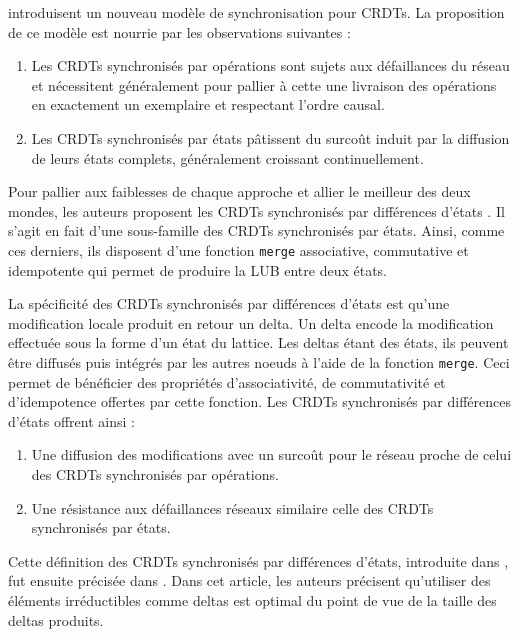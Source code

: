\textcite{almeida2015delta} introduisent un nouveau modèle de synchronisation pour \acp{CRDT}.
La proposition de ce modèle est nourrie par les observations suivantes :
\begin{enumerate}
  \item Les \acp{CRDT} synchronisés par opérations sont sujets aux défaillances du réseau et nécessitent généralement pour pallier à cette  une livraison des opérations en exactement un exemplaire et respectant l'ordre causal.
  \item Les \acp{CRDT} synchronisés par états pâtissent du surcoût induit par la diffusion de leurs états complets, généralement croissant continuellement.
\end{enumerate}

Pour pallier aux faiblesses de chaque approche et allier le meilleur des deux mondes, les auteurs proposent les \acp{CRDT} synchronisés par différences d'états \cite{almeida2015delta,Almeida_2018, enes2019}.
Il s'agit en fait d'une sous-famille des \acp{CRDT} synchronisés par états.
Ainsi, comme ces derniers, ils disposent d'une fonction \texttt{merge} associative, commutative et idempotente qui permet de produire la LUB entre deux états.

La spécificité des \acp{CRDT} synchronisés par différences d'états est qu'une modification locale produit en retour un delta.
Un delta encode la modification effectuée sous la forme d'un état du lattice.
Les deltas étant des états, ils peuvent être diffusés puis intégrés par les autres noeuds à l'aide de la fonction \texttt{merge}.
Ceci permet de bénéficier des propriétés d'associativité, de commutativité et d'idempotence offertes par cette fonction.
Les \acp{CRDT} synchronisés par différences d'états offrent ainsi :
\begin{enumerate}
  \item Une diffusion des modifications avec un surcoût pour le réseau proche de celui des \acp{CRDT} synchronisés par opérations.
  \item Une résistance aux défaillances réseaux similaire celle des \acp{CRDT} synchronisés par états.
\end{enumerate}

Cette définition des \acp{CRDT} synchronisés par différences d'états, introduite dans \cite{almeida2015delta,Almeida_2018}, fut ensuite précisée dans \cite{enes2019}.
Dans cet article, les auteurs précisent qu'utiliser des éléments irréductibles  comme deltas est optimal du point de vue de la taille des deltas produits.

